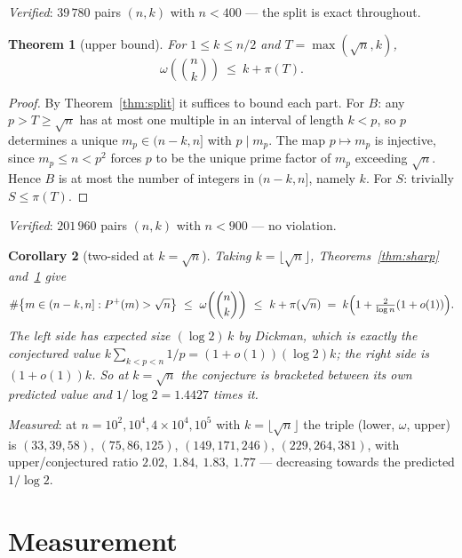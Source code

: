 \documentclass[11pt]{article}
\newtheorem{theorem}{Theorem}
\newtheorem{corollary}[theorem]{Corollary}
\begin{document}
\emph{Verified}: $39\,780$ pairs $(n,k)$ with $n<400$ --- the split is exact throughout.

\begin{theorem}[upper bound]\label{thm:upperbd}
For $1\le k\le n/2$ and $T=\max(\sqrt n,k)$,
\[
  \omega\!\left(\binom nk\right)\ \le\ k+\pi(T).
\]
\end{theorem}

\begin{proof}
By Theorem~\ref{thm:split} it suffices to bound each part.  For $B$: any $p>T\ge\sqrt n$ has
at most one multiple in an interval of length $k<p$, so $p$ determines a unique
$m_p\in(n-k,n]$ with $p\mid m_p$.  The map $p\mapsto m_p$ is injective, since $m_p\le n<p^2$
forces $p$ to be the unique prime factor of $m_p$ exceeding $\sqrt n$.  Hence $B$ is at most
the number of integers in $(n-k,n]$, namely $k$.  For $S$: trivially $S\le\pi(T)$.
\end{proof}

\emph{Verified}: $201\,960$ pairs $(n,k)$ with $n<900$ --- no violation.

\begin{corollary}[two-sided at $k=\sqrt n$]\label{cor:twosided}
Taking $k=\lfloor\sqrt n\rfloor$, Theorems~\ref{thm:sharp} and~\ref{thm:upperbd} give
\[
  \#\bigl\{m\in(n-k,n]:P^{+}(m)>\sqrt n\bigr\}\ \le\ \omega\!\left(\binom nk\right)
  \ \le\ k+\pi(\sqrt n)\;=\;k\Bigl(1+\tfrac{2}{\log n}(1+o(1))\Bigr).
\]
The left side has expected size $(\log2)\,k$ by Dickman, which is exactly the conjectured
value $k\sum_{k<p<n}1/p=(1+o(1))(\log2)k$; the right side is $(1+o(1))k$.  So at
$k=\sqrt n$ the conjecture is bracketed between its own predicted value and
$1/\log2=1.4427$ times it.
\end{corollary}

\emph{Measured}: at $n=10^{2},10^{4},4\times10^{4},10^{5}$ with $k=\lfloor\sqrt n\rfloor$
the triple (lower, $\omega$, upper) is $(33,39,58)$, $(75,86,125)$, $(149,171,246)$,
$(229,264,381)$, with upper/conjectured ratio $2.02,\ 1.84,\ 1.83,\ 1.77$ --- decreasing
towards the predicted $1/\log2$.

\section{Measurement}
\end{document}
